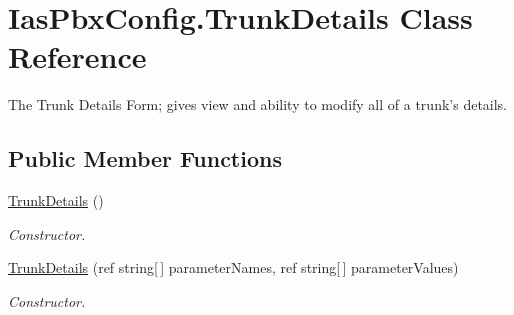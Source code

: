 \hypertarget{class_ias_pbx_config_1_1_trunk_details}{
\section{IasPbxConfig.TrunkDetails Class Reference}
\label{class_ias_pbx_config_1_1_trunk_details}
}


The Trunk Details Form; gives view and ability to modify all of a trunk's details.  
\subsection*{Public Member Functions}
\begin{DoxyCompactItemize}
\item 
\hyperlink{class_ias_pbx_config_1_1_trunk_details_a4b5a6988b18e4369e011304054412810}{TrunkDetails} ()
\begin{DoxyCompactList}\small\item\em Constructor. \item\end{DoxyCompactList}\item 
\hyperlink{class_ias_pbx_config_1_1_trunk_details_a06f0aec8ae91761316148980e1f8de53}{TrunkDetails} (ref string\mbox{[}$\,$\mbox{]} parameterNames, ref string\mbox{[}$\,$\mbox{]} parameterValues)
\begin{DoxyCompactList}\small\item\em Constructor. \item\end{DoxyCompactList}\end{DoxyCompactItemize}
